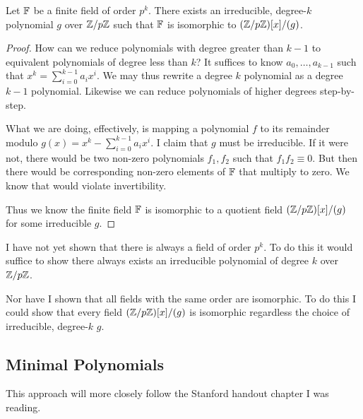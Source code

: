 \begin{theorem}
  Let $\mathbb{F}$ be a finite field of order $p^k$. There exists an
  irreducible, degree-$k$ polynomial $g$ over $\mathbb{Z} / p\mathbb{Z}$ such that $\mathbb{F}$ is
  isomorphic to $\mathopen{}\left( {\mathbb{Z} / p\mathbb{Z}} \right)\mathclose{}[x]/(g)$.
\end{theorem}

\begin{proof}
  How can we reduce polynomials with degree greater than $k-1$ to
  equivalent polynomials of degree less than $k$? It suffices to know
  $a_0, \ldots, a_{k-1}$ such that $x^k = \sum_{i=0}^{k-1} a_i x^i$. We
  may thus rewrite a degree $k$ polynomial as a degree $k-1$ polynomial.
  Likewise we can reduce polynomials of higher degrees step-by-step.

  What we are doing, effectively, is mapping a polynomial $f$ to its
  remainder modulo $g(x) = x^k - \sum_{i=0}^{k-1} a_i x^i$. I claim that
  $g$ must be irreducible. If it were not, there would be two non-zero
  polynomials $f_1, f_2$ such that $f_1 f_2 \equiv 0$. But then there
  would be corresponding non-zero elements of $\mathbb{F}$ that multiply to
  zero. We know that would violate invertibility.

  Thus we know the finite field $\mathbb{F}$ is isomorphic to a quotient field
  $\mathopen{}\left( {\mathbb{Z} / p\mathbb{Z}} \right)\mathclose{}[x]/(g)$ for some irreducible $g$.
\end{proof}

\begin{remark}
  I have not yet shown that there is always a field of order $p^k$. To
  do this it would suffice to show there always exists an irreducible
  polynomial of degree $k$ over $\mathbb{Z} / p\mathbb{Z}$.

  Nor have I shown that all fields with the same order are isomorphic.
  To do this I could show that every field $\mathopen{}\left( {\mathbb{Z} / p\mathbb{Z}} \right)\mathclose{}[x]/(g)$ is
  isomorphic regardless the choice of irreducible, degree-$k$ $g$.
\end{remark}

\subsection{Minimal Polynomials}

\begin{remark}
  This approach will more closely follow the Stanford handout chapter I
  was reading.
\end{remark}

\newcommand{\Fp}{\F_p}
\newcommand{\Fq}{\F_q}
\newcommand{\Fmodg}{\Fp[x]/(g)}

